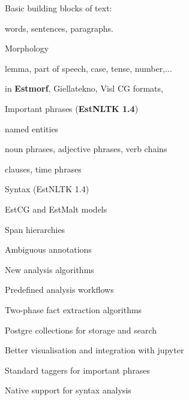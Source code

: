 \documentclass[landscape,footrule]{foils}
\begin{document}
\begin{triangles}
\item Basic building blocks of text:\vspace*{0.5ex} 
\begin{diamonds}
\item words, sentences, paragraphs.\vspace*{2ex} 
\end{diamonds}
\item Morphology\vspace*{0.5ex} 
\begin{diamonds}
\item lemma, part of speech, case, tense, number,$\ldots$
\item in \textcolor{blue!100}{\textbf{Estmorf}}, \textcolor{blue!70}{Giellatekno}, \textcolor{blue!40}{Visl CG} formats,  \vspace*{2ex} 
\end{diamonds}
\item Important phrases (\textcolor{orange!80!black!60}{\textbf{EstNLTK 1.4}})
\vspace*{0.5ex} 
\begin{diamonds}
\item named entities
\item noun phrases, adjective phrases, verb chains 
\item clauses, time phrases\vspace*{2ex}  
\end{diamonds}

\item \textcolor{gray!70}{Syntax (EstNLTK 1.4)}
\vspace*{0.5ex} 
\begin{diamonds}
\item \textcolor{gray!70}{EstCG and EstMalt models}
\end{diamonds}
\end{triangles}


\begin{triangles}
\item \textcolor{green!50!black!100}{Span hierarchies}
\item \textcolor{green!50!black!100}{Ambiguous annotations}

\item \textcolor{orange!90}{New analysis algorithms}
\item \textcolor{green!50!black!100}{Predefined analysis workflows}
\item \textcolor{green!50!black!100}{Two-phase fact extraction algorithms}
\item \textcolor{green!50!black!100}{Postgre collections for storage and search}
\item \textcolor{orange!90}{Better visualisation and integration with jupyter}
\item \textcolor{orange!90}{Standard taggers for important phrases}
\item \textcolor{red!90!black!100}{Native support for syntax analysis}

\end{triangles}
\end{document}
